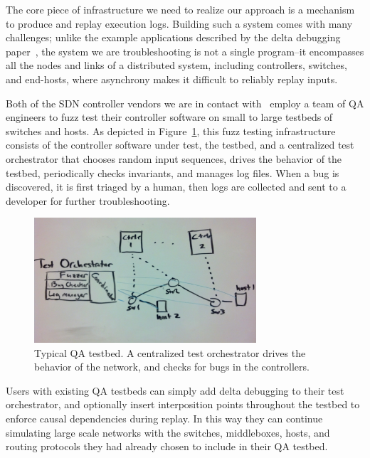 The core piece of infrastructure we need to realize our approach is a
mechanism to produce and replay execution logs. Building such a system comes
with many challenges; unlike the example applications described
by the delta debugging paper~\cite{Zeller:1999:YMP:318773.318946}, the system we are troubleshooting is not a
single program--it encompasses all the nodes and links of a distributed system,
including controllers, switches, and end-hosts, where asynchrony
makes it difficult to reliably replay inputs.

Both of the SDN controller vendors we are in contact with~\cite{nicirahomepage,bigswitch} employ a team of QA
engineers to fuzz test their controller software on small to large testbeds of switches and hosts.
As depicted in Figure~\ref{fig:qa_cluster}, this fuzz testing infrastructure
consists of the controller software under test, the testbed, and a centralized
test orchestrator
that chooses random input sequences, drives the behavior of the testbed,
periodically checks invariants, and manages log files. When a bug is discovered, it is first triaged
by a human, then logs are collected and sent to a developer for further troubleshooting.

\begin{figure}[t]
    \includegraphics[width=3.25in]{../diagrams/architecture/qa_cluster.jpg}
    \caption[]{\label{fig:qa_cluster} Typical QA testbed. A centralized test
    orchestrator drives the behavior of the network, and checks for bugs in
    the controllers.}
\end{figure}

Users with existing
QA testbeds can simply add delta debugging to their test
orchestrator, and optionally insert interposition points throughout the
testbed to enforce causal dependencies during replay.
In this way they can continue simulating large scale networks with
the switches, middleboxes, hosts, and routing protocols they had already
chosen to include in their QA testbed.

